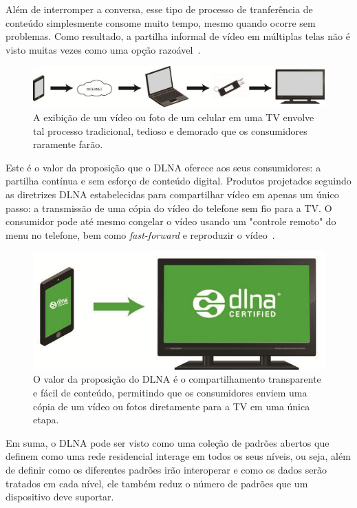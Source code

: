 Além de interromper a conversa, esse tipo de processo de tranferência de conteúdo simplesmente consome muito tempo, mesmo quando ocorre sem problemas. Como resultado, a partilha informal de vídeo em múltiplas telas não é visto muitas vezes como uma opção razoável~\cite{dlnahdvideostreaming}.

\begin{figure}[ht]
	\center
	\includegraphics[scale=0.3]{imagens/dlna1}
	\caption{A exibição de um vídeo ou foto de um celular em uma TV envolve tal processo tradicional, tedioso e demorado que os consumidores raramente farão.}
	\label{fig:traditionalProccess}
\end{figure}

Este é o valor da proposição que o DLNA oferece aos seus consumidores: a partilha contínua e sem esforço de conteúdo digital. Produtos projetados seguindo as diretrizes DLNA estabelecidas para compartilhar vídeo em apenas um único passo: a transmissão de uma cópia do vídeo do telefone sem fio para a TV. O consumidor pode até mesmo congelar o vídeo usando um "controle remoto" do menu no telefone, bem como \emph{fast-forward} e reproduzir o vídeo~\cite{dlnahdvideostreaming}.

\begin{figure}[ht]
	\center
	\includegraphics[scale=0.3]{imagens/dlna2}
	\caption{O valor da proposição do DLNA é o compartilhamento transparente e fácil de conteúdo, permitindo que os consumidores enviem uma cópia de um vídeo ou fotos diretamente para a TV em uma única etapa.}
	\label{fig:dlnaProccess}
\end{figure}

Em suma, o DLNA pode ser visto como uma coleção de padrões abertos que definem como uma rede residencial interage em todos os seus níveis, ou seja, além de definir como os diferentes padrões irão interoperar e como os dados serão tratados em cada nível, ele também reduz o número de padrões que um dispositivo deve suportar.

